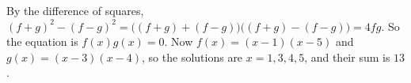 By the difference of squares, $(f+g)^2-(f-g)^2=\bigl((f+g)+(f-g)\bigr)\bigl((f+g)-(f-g)\bigr)=4fg$. So the equation is $f(x)g(x)=0$. Now $f(x)=(x-1)(x-5)$ and $g(x)=(x-3)(x-4)$, so the solutions are $x=1,3,4,5$, and their sum is $\boxed{13}$.
